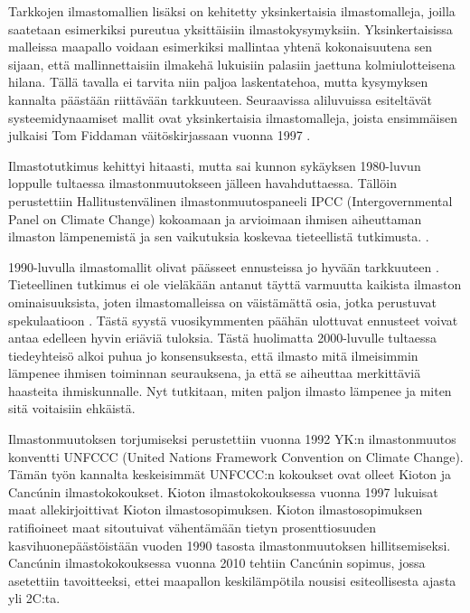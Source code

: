 \documentclass[finnish,12pt,a4paper,pdftex]{article}
\begin{document}
\begin{onehalfspacing}
Tarkkojen ilmastomallien lisäksi on kehitetty yksinkertaisia ilmastomalleja, joilla saatetaan esimerkiksi pureutua yksittäisiin ilmastokysymyksiin. Yksinkertaisissa malleissa maapallo voidaan esimerkiksi mallintaa yhtenä kokonaisuutena sen sijaan, että mallinnettaisiin ilmakehä lukuisiin palasiin jaettuna kolmiulotteisena hilana. Tällä tavalla ei tarvita niin paljoa laskentatehoa, mutta kysymyksen kannalta päästään riittävään tarkkuuteen. \cite{AmericanInstituteofPhysicsSimple} Seuraavissa aliluvuissa esiteltävät systeemidynaamiset mallit ovat yksinkertaisia ilmastomalleja, joista ensimmäisen julkaisi Tom Fiddaman väitöskirjassaan vuonna 1997 \cite{Fiddaman1997}. 

Ilmastotutkimus kehittyi hitaasti, mutta sai kunnon sykäyksen 1980-luvun loppulle tultaessa ilmastonmuutokseen jälleen havahduttaessa. \cite{AmericanInstituteofPhysics} Tällöin perustettiin Hallitustenvälinen ilmastonmuutospaneeli IPCC (Intergovernmental Panel on Climate Change) kokoamaan ja arvioimaan ihmisen aiheuttaman ilmaston lämpenemistä ja sen vaikutuksia koskevaa tieteellistä tutkimusta. \cite{IPCChistory}. 

1990-luvulla ilmastomallit olivat päässeet ennusteissa jo hyvään tarkkuuteen \cite{AmericanInstituteofPhysics}. Tieteellinen tutkimus ei ole vieläkään antanut täyttä varmuutta kaikista ilmaston ominaisuuksista, joten ilmastomalleissa on väistämättä osia, jotka perustuvat spekulaatioon \cite{CroadsFlightSimulator2011}. Tästä syystä vuosikymmenten päähän ulottuvat ennusteet voivat antaa edelleen hyvin eriäviä tuloksia. Tästä huolimatta 2000-luvulle tultaessa tiedeyhteisö alkoi puhua jo konsensuksesta, että ilmasto mitä ilmeisimmin lämpenee ihmisen toiminnan seurauksena, ja että se aiheuttaa merkittäviä haasteita ihmiskunnalle. Nyt tutkitaan, miten paljon ilmasto lämpenee ja miten sitä voitaisiin ehkäistä. \cite{AmericanInstituteofPhysics}

Ilmastonmuutoksen torjumiseksi perustettiin vuonna 1992 YK:n ilmastonmuutos konventti UNFCCC (United Nations Framework Convention on Climate Change). Tämän työn kannalta keskeisimmät UNFCCC:n kokoukset ovat olleet Kioton ja Cancúnin ilmastokokoukset. Kioton ilmastokokouksessa vuonna 1997 lukuisat maat allekirjoittivat Kioton ilmastosopimuksen. Kioton ilmastosopimuksen ratifioineet maat sitoutuivat vähentämään tietyn prosenttiosuuden kasvihuonepäästöistään vuoden 1990 tasosta ilmastonmuutoksen hillitsemiseksi. Cancúnin ilmastokokouksessa vuonna 2010 tehtiin Cancúnin sopimus, jossa asetettiin tavoitteeksi, ettei maapallon keskilämpötila nousisi esiteollisesta ajasta yli 2\degree C:ta. \cite{UNFCCC} 


\end{onehalfspacing}
\end{document}
